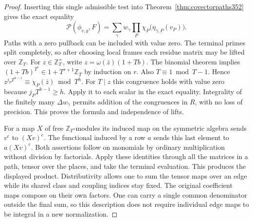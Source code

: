 \documentclass[a4paper,11pt]{article}
\theoremstyle{definition}
\theoremstyle{remark}
\numberwithin{equation}{section}
\begin{document}
\begin{proof}
Inserting this single admissible test into
Theorem~\ref{thm:covectorpaths352} gives the exact equality
\[
   \mathcal P(\phi_{v,y},F)
     =\sum_\gamma w_\gamma
               \prod_P\chi_P\big(\eta_{\gamma,P}(v_P)\big).
\]
Paths with a zero pullback can be included with value zero.
The terminal primes split completely, so after choosing local
frames each residue matrix may be lifted over \(\mathbb Z_T\).
For \(z\in\mathbb Z_T^\times\), write
\(z=\omega(\bar z)(1+Tb)\). The binomial theorem implies
\((1+Tb)^{T^r}\in1+T^{r+1}\mathbb Z_T\) by induction on \(r\).
Also \(T\equiv1\bmod T-1\). Hence
\(z^{j_PT^{h-1}}\equiv\chi_P(\bar z)\bmod T^h\).
For \(T\mid z\) this congruence holds with value zero because
\(j_PT^{h-1}\ge h\). Apply it to each scalar in the exact
equality. Integrality of the finitely many \(\Delta w_\gamma\)
permits addition of the congruences in \(R\), with no loss
of precision. This proves the formula and independence of lifts.

For a map \(X\) of free \(\mathbb Z_T\)-modules its induced
map on the symmetric algebra sends \(v^e\) to \((Xv)^e\).
The functional induced by a row \(a\) sends this last element
to \(a(Xv)^e\). Both assertions follow on monomials by ordinary
multiplication without division by factorials. Apply these
identities through all the matrices in a path, tensor over
the places, and take the terminal evaluation. This produces
the displayed product. Distributivity allows one to sum the
tensor maps over an edge while its shared class and coupling
indices stay fixed. The original coefficient maps compose
on their own factors. One can carry a single common denominator
outside the final sum, so this description does not require
individual edge maps to be integral in a new normalization.
\end{proof}
\end{document}
